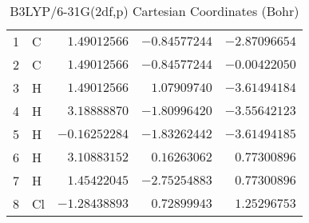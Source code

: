 \documentclass[10pt,oneside]{article}
\begin{document}
\begin{table}[h!]
\centering
\caption{B3LYP/6-31G(2df,p) Cartesian Coordinates (Bohr)}
\begin{tabular}{llrrr}
1  & C  & $ 1.49012566$ & $-0.84577244$ & $-2.87096654$ \\
2  & C  & $ 1.49012566$ & $-0.84577244$ & $-0.00422050$ \\
3  & H  & $ 1.49012566$ & $ 1.07909740$ & $-3.61494184$ \\
4  & H  & $ 3.18888870$ & $-1.80996420$ & $-3.55642123$ \\
5  & H  & $-0.16252284$ & $-1.83262442$ & $-3.61494185$ \\
6  & H  & $ 3.10883152$ & $ 0.16263062$ & $ 0.77300896$ \\
7  & H  & $ 1.45422045$ & $-2.75254883$ & $ 0.77300896$ \\
8  & Cl & $-1.28438893$ & $ 0.72899943$ & $ 1.25296753$ \\
\end{tabular}
\end{table}

\clearpage
\end{document}

